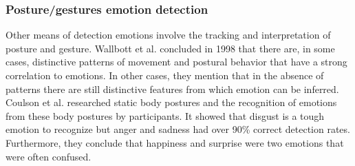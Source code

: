 \documentclass{sigchi}
\begin{document}
\subsubsection{Posture/gestures emotion detection}
Other means of detection emotions involve the tracking and interpretation of posture and gesture. Wallbott et al. \cite{Wallbott1998} concluded in 1998 that there are, in some cases, distinctive patterns of movement and postural behavior that have a strong correlation to emotions. In other cases, they mention that in the absence of patterns there are still distinctive features from which emotion can be inferred. Coulson et al. \cite{Coulson2004} researched static body postures and the recognition of emotions from these body postures by participants. It showed that disgust is a tough emotion to recognize but anger and sadness had over 90\% correct detection rates. Furthermore, they conclude that happiness and surprise were two emotions that were often confused. 
\end{document}
